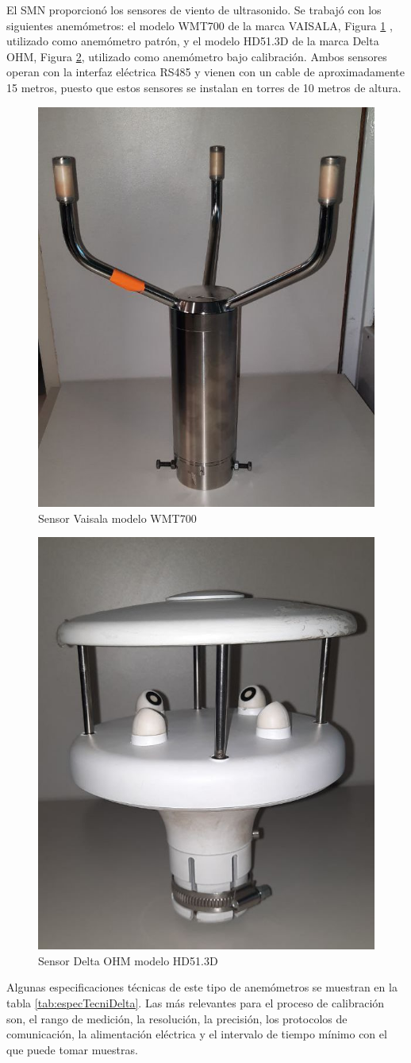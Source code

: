 El SMN proporcionó los sensores de viento de ultrasonido. Se trabajó con los siguientes anemómetros: el modelo WMT700 de la marca VAISALA, Figura \ref{fig:sensorVaisala}
, utilizado como anemómetro patrón, y el modelo HD51.3D de la marca Delta OHM, Figura \ref{fig:sensorDeltaOhm}, utilizado como anemómetro bajo calibración. Ambos sensores operan con la interfaz eléctrica RS485 y vienen con un cable de aproximadamente 15 metros, puesto que estos sensores se instalan en torres de 10 metros de altura.

\begin{figure}[H]
    \centering
    \includegraphics[width=0.4\linewidth]{Figuras/datalogger/Hardware/sensorVaisala.jpg}
    \caption{Sensor Vaisala modelo WMT700}
    \label{fig:sensorVaisala}
\end{figure}


\begin{figure}[H]
    \centering
    \includegraphics[width=0.4\linewidth]{Figuras/datalogger/Hardware/sensorDeltaOhm.jpg}
    \caption{Sensor Delta OHM modelo HD51.3D}
    \label{fig:sensorDeltaOhm}
\end{figure}
 Algunas especificaciones técnicas de este tipo de anemómetros se muestran en la tabla \ref{tab:especTecniDelta}. Las más relevantes para el proceso de calibración son, el rango de medición, la resolución, la precisión, los protocolos de comunicación, la alimentación eléctrica y el intervalo de tiempo mínimo con el que puede tomar muestras. 


